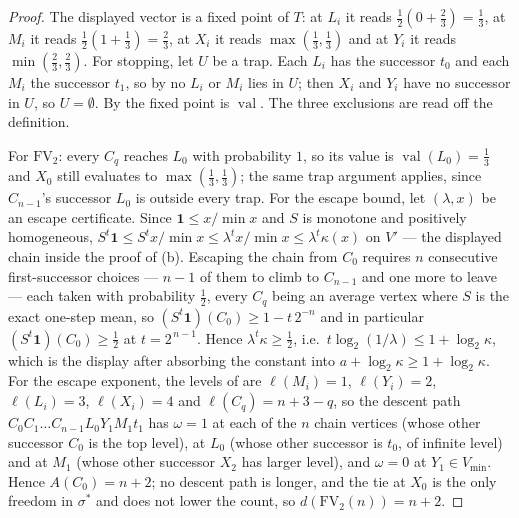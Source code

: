 \documentclass[11pt]{article}
\theoremstyle{plain}
\theoremstyle{definition}
\DeclareMathOperator{\val}{val}
\newcommand{\Vmin}{V_{\min}}
\newcommand{\bbone}{\mathbf{1}}
\begin{document}
\begin{proof}
The displayed vector is a fixed point of $T$: at $L_i$ it reads
$\tfrac12(0+\tfrac23)=\tfrac13$, at $M_i$ it reads
$\tfrac12(1+\tfrac13)=\tfrac23$, at $X_i$ it reads
$\max(\tfrac13,\tfrac13)$ and at $Y_i$ it reads
$\min(\tfrac23,\tfrac23)$. For stopping, let $U$ be a trap. Each $L_i$ has
the successor $t_0$ and each $M_i$ the successor $t_1$, so by
 no $L_i$ or $M_i$ lies in $U$; then $X_i$ and $Y_i$
have no successor in $U$, so $U=\emptyset$. By  the
fixed point is $\val$. The three exclusions are read off the definition.

For $\mathrm{FV}_2$: every $C_q$ reaches $L_0$ with probability $1$, so its
value is $\val(L_0)=\tfrac13$ and $X_0$ still evaluates to
$\max(\tfrac13,\tfrac13)$; the same trap argument applies, since
$C_{n-1}$'s successor $L_0$ is outside every trap. For the escape bound,
let $(\lambda,x)$ be an escape certificate. Since $\bbone\le x/\min x$ and $S$ is monotone and positively
homogeneous, $S^{t}\bbone\le S^{t}x/\min x\le\lambda^{t}x/\min x
\le\lambda^{t}\kappa(x)$ on $V'$ --- the displayed chain inside the proof
of (b). Escaping the chain from $C_0$ requires $n$
consecutive first-successor choices --- $n-1$ of them to climb to
$C_{n-1}$ and one more to leave --- each taken with probability
$\tfrac12$, every $C_q$ being an average vertex where $S$ is the exact
one-step mean, so $(S^{t}\bbone)(C_0)\ge1-t\,2^{-n}$ and in particular
$(S^{t}\bbone)(C_0)\ge\tfrac12$ at $t=2^{\,n-1}$. Hence
$\lambda^{t}\kappa\ge\tfrac12$, i.e.\
$t\log_2(1/\lambda)\le1+\log_2\kappa$, which is the display after
absorbing the constant into $a+\log_2\kappa\ge1+\log_2\kappa$. For the escape exponent, the levels of  are
$\ell(M_i)=1$, $\ell(Y_i)=2$, $\ell(L_i)=3$, $\ell(X_i)=4$ and
$\ell(C_q)=n+3-q$, so the descent path
$C_0C_1\dots C_{n-1}L_0Y_1M_1t_1$ has $\omega=1$ at each of the $n$ chain
vertices (whose other successor $C_0$ is the top level), at $L_0$ (whose
other successor is $t_0$, of infinite level) and at $M_1$ (whose other
successor $X_2$ has larger level), and $\omega=0$ at $Y_1\in\Vmin$. Hence
$A(C_0)=n+2$; no descent path is longer, and the tie at $X_0$ is the only
freedom in $\sigma^\ast$ and does not lower the count, so
$d(\mathrm{FV}_2(n))=n+2$.
\end{proof}
\end{document}
